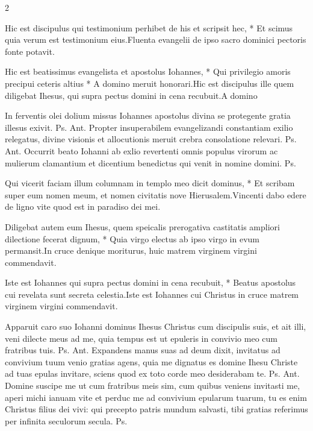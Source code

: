 \begin{multicols*}{2}
\begin{responsory}
{Hic est discipulus qui testimonium perhibet de his et scripsit hec, * Et scimus quia verum est testimonium eius.}{Fluenta evangelii de ipso sacro dominici pectoris fonte potavit.}
\end{responsory}%
\begin{responsory-final}
{Hic est beatissimus evangelista et apostolus Iohannes, * Qui privilegio amoris precipui ceteris altius * A domino meruit honorari.}{Hic est discipulus ille quem diligebat Ihesus, qui supra pectus domini in cena recubuit.}{A domino}
\end{responsory-final}%
 In ferventis olei dolium missus Iohannes apostolus divina se protegente gratia illesus exivit. {\color{Red} Ps.}  {\color{Red} Ant.} Propter insuperabilem evangelizandi constantiam exilio relegatus, divine visionis et allocutionis meruit crebra consolatione relevari. {\color{Red} Ps.}  {\color{Red} Ant.} Occurrit beato Iohanni ab exlio revertenti omnis populus virorum ac mulierum clamantium et dicentium benedictus qui venit in nomine domini. {\color{Red} Ps.} 
\begin{responsory}
{Qui vicerit faciam illum columnam in templo meo dicit dominus, * Et scribam super eum nomen meum, et nomen civitatis nove Hierusalem.}{Vincenti dabo edere de ligno vite quod est in paradiso dei mei.}
\end{responsory}%
\begin{responsory}
{Diligebat autem eum Ihesus, quem speicalis prerogativa castitatis ampliori dilectione fecerat dignum, * Quia virgo electus ab ipso virgo in evum permansit.}{In cruce denique moriturus, huic matrem virginem virgini commendavit.}
\end{responsory}%
\begin{responsory-doxology}
{Iste est Iohannes qui supra pectus domini in cena recubuit, * Beatus apostolus cui revelata sunt secreta celestia.}{Iste est Iohannes cui Christus in cruce matrem virginem virgini commendavit.}
\end{responsory-doxology}%
 Apparuit caro suo Iohanni dominus Ihesus Christus cum discipulis suis, et ait illi, veni dilecte meus ad me, quia tempus est ut epuleris in convivio meo cum fratribus tuis. {\color{Red} Ps.}  {\color{Red} Ant.} Expandens manus suas ad deum dixit, invitatus ad convivium tuum venio gratias agens, quia me dignatus es domine Ihesu Christe ad tuas epulas invitare, sciens quod ex toto corde meo desiderabam te. {\color{Red} Ps.}  {\color{Red} Ant.} Domine suscipe me ut cum fratribus meis sim, cum quibus veniens invitasti me, aperi michi ianuam vite et perduc me ad convivium epularum tuarum, tu es enim Christus filius dei vivi: qui precepto patris mundum salvasti, tibi gratias referimus per infinita seculorum secula. {\color{Red} Ps.} 

\end{multicols*}
